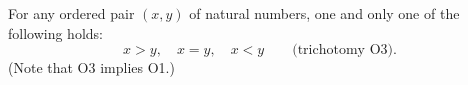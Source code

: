 For any ordered pair $(x,y)$ of natural numbers, one and only one of the following holds:
$$x > y, \quad x = y, \quad x < y \qquad \text{(trichotomy O3)}.$$
(Note that O3 implies O1.)
